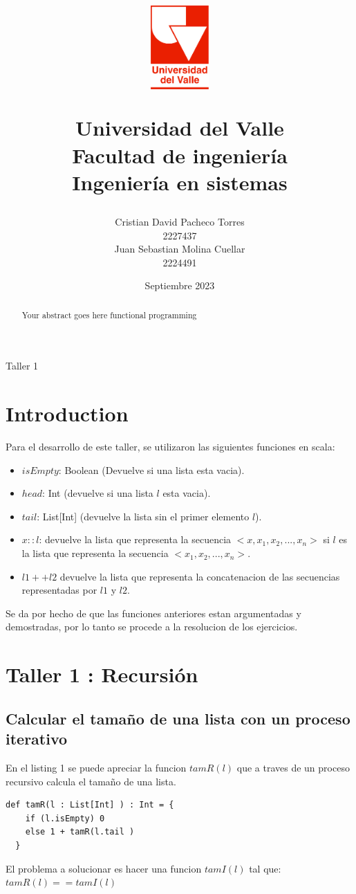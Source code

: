 \documentclass[12pt, a4paper]{article}
\title{
  \begin{figure}[th]
    \centering
    \includegraphics[width=0.2\textwidth]{Univalle}
  \end{figure}
  \textbf{Universidad del Valle
    \\{\Large Facultad de ingeniería}
  \\{\large Ingeniería en sistemas}}}
\author{Cristian David Pacheco Torres
  \\ 2227437
  \\ Juan Sebastian Molina Cuellar
  \\ 2224491}
\date{Septiembre 2023}
\begin{document}
\maketitle
Taller 1
\newpage{}
\begin{abstract}
Your abstract goes here functional programming
\end{abstract}
\newpage{}
\tableofcontents
\newpage{}
\section{Introduction}
Para el desarrollo de este taller, se utilizaron las siguientes funciones en scala: \\
\begin{itemize}
  \item $isEmpty$: Boolean (Devuelve si una lista esta vacia).
  \item $head$: Int (devuelve si una lista $l$ esta vacia).
  \item $tail$: List[Int] (devuelve la lista sin el primer elemento $l$).
  \item $x::l$: devuelve la lista que representa la secuencia $<x,x_1,x_2,...,x_n>$ si $l$ es la lista que representa
  la secuencia $<x_1,x_2,...,x_n>$.
  \item $l1 ++ l2$ devuelve la lista que representa la concatenacion de las secuencias representadas por $l1$ y $l2$.
\end{itemize}
Se da por hecho de que las funciones anteriores estan argumentadas y demostradas, por lo tanto se procede a la resolucion de los ejercicios.
\section{Taller 1 : Recursión}
\subsection{Calcular el tamaño de una lista con un proceso iterativo}
En el listing 1 se puede apreciar la funcion $tamR(l)$ que a traves de un proceso recursivo calcula el tamaño de una lista.
\begin{lstlisting}[style=scalaStyle, caption=Calcula el tamaño de una lista con un proceso recursivo]
  def tamR(l : List[Int] ) : Int = {
    if (l.isEmpty) 0
    else 1 + tamR(l.tail )
  }
\end{lstlisting}
El problema a solucionar es hacer una funcion $tamI(l)$ tal que: \\
$tamR(l) == tamI(l)$
\end{document}
